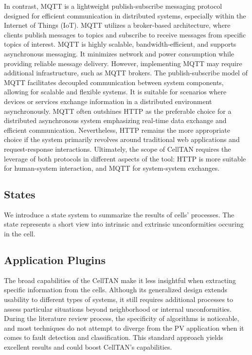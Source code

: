 
In contrast, MQTT is a lightweight publish-subscribe messaging protocol designed for efficient communication in distributed systems, especially within the Internet of Things (IoT). MQTT utilizes a broker-based architecture, where clients publish messages to topics and subscribe to receive messages from specific topics of interest. MQTT is highly scalable, bandwidth-efficient, and supports asynchronous messaging. It minimizes network and power consumption while providing reliable message delivery. However, implementing MQTT may require additional infrastructure, such as MQTT brokers.
The publish-subscribe model of MQTT facilitates decoupled communication between system components, allowing for scalable and flexible systems. It is suitable for scenarios where devices or services exchange information in a distributed environment asynchronously. MQTT often outshines HTTP as the preferable choice for a distributed asynchronous system emphasizing real-time data exchange and efficient communication. Nevertheless, HTTP remains the more appropriate choice if the system primarily revolves around traditional web applications and request-response interactions. Ultimately, the scope of CellTAN requires the leverage of both protocols in different aspects of the tool: HTTP is more suitable for human-system interaction, and MQTT for system-system exchanges.


\subsection{States}

We introduce a state system to summarize the results of cells' processes. The state represents a short view into intrinsic and extrinsic unconformities occuring in the cell.

\subsection{Application Plugins}


The broad capabilities of the CellTAN make it less insightful when extracting specific information from the cells. Although its generalized design extends usability to different types of systems, it still requires additional processes to assess particular situations beyond neighborhood or internal unconformities. During the literature review process, the specificity of algorithms is noticeable, and most techniques do not attempt to diverge from the PV application when it comes to fault detection and classification. This standard approach yields excellent results and could boost CellTAN's capabilities.


